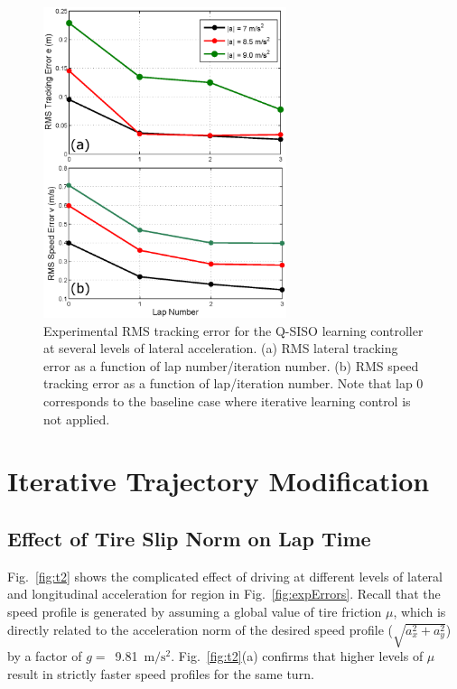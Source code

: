 \documentclass[9pt,shortpaper,twoside,web]{ieeecolor}
\newcommand*\circled[1]{\tikz[baseline=(char.base)]{
            \node[shape=circle,draw,inner sep=2pt] (char) {#1};}}
\begin{document}
{{{\begin{figure}
\centering
\includegraphics[width=2.8in]{figures/expRes3.eps}
\caption[Experimental RMS tracking error for the Q-SISO learning controller at several levels of lateral acceleration. ]{Experimental RMS tracking error for the Q-SISO learning controller at several levels of lateral acceleration. (a) RMS lateral tracking
error as a function of lap number/iteration number. (b) RMS speed tracking error as a function of lap/iteration number. Note that lap 0 corresponds
to the baseline case where iterative learning control is not applied.}
\label{fig:expRes3}
\end{figure}

\section{Iterative Trajectory Modification}
\subsection{Effect of Tire Slip Norm on Lap Time}
\label{sec:etu}

Fig.~\ref{fig:t2} shows the complicated effect of driving at different levels of lateral and longitudinal acceleration for region \circled{2} in Fig.~\ref{fig:expErrors}. Recall that the
speed profile is generated by assuming a global value of tire friction $\mu$, which is directly related to the acceleration norm of
the desired speed profile ($\sqrt{a_x^2 + a_y^2}$) by a factor of \mbox{$g =$ 9.81 $\mathrm{m/s^2}$}. Fig.~\ref{fig:t2}(a) confirms that higher levels
of $\mu$ result in strictly faster speed profiles for the same turn. 

}}}
\end{document}
